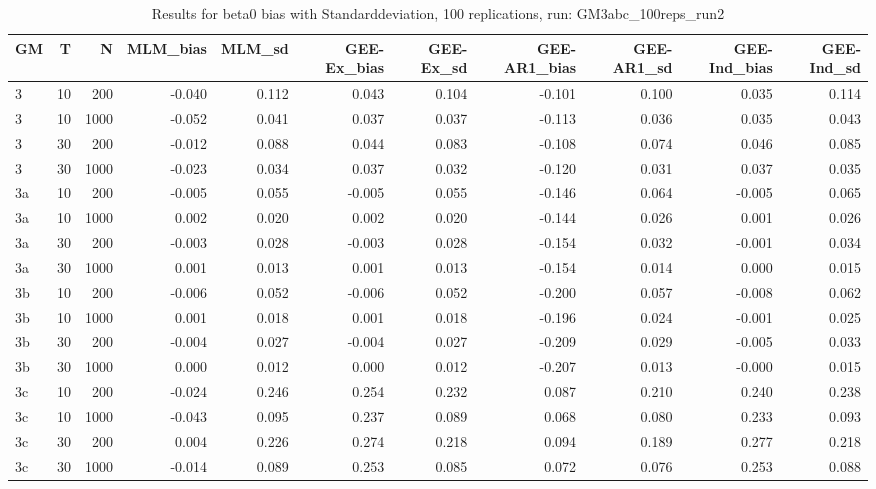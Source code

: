 \begin{table}[ht]
\centering
\begin{tabular}{lrrrrrrrrrr}
  \hline
GM & T & N & MLM\_bias & MLM\_sd & GEE-Ex\_bias & GEE-Ex\_sd & GEE-AR1\_bias & GEE-AR1\_sd & GEE-Ind\_bias & GEE-Ind\_sd \\ 
  \hline
3 & 10 & 200 & -0.040 & 0.112 & 0.043 & 0.104 & -0.101 & 0.100 & 0.035 & 0.114 \\ 
  3 & 10 & 1000 & -0.052 & 0.041 & 0.037 & 0.037 & -0.113 & 0.036 & 0.035 & 0.043 \\ 
  3 & 30 & 200 & -0.012 & 0.088 & 0.044 & 0.083 & -0.108 & 0.074 & 0.046 & 0.085 \\ 
  3 & 30 & 1000 & -0.023 & 0.034 & 0.037 & 0.032 & -0.120 & 0.031 & 0.037 & 0.035 \\ 
  3a & 10 & 200 & -0.005 & 0.055 & -0.005 & 0.055 & -0.146 & 0.064 & -0.005 & 0.065 \\ 
  3a & 10 & 1000 & 0.002 & 0.020 & 0.002 & 0.020 & -0.144 & 0.026 & 0.001 & 0.026 \\ 
   \hline
3a & 30 & 200 & -0.003 & 0.028 & -0.003 & 0.028 & -0.154 & 0.032 & -0.001 & 0.034 \\ 
  3a & 30 & 1000 & 0.001 & 0.013 & 0.001 & 0.013 & -0.154 & 0.014 & 0.000 & 0.015 \\ 
  3b & 10 & 200 & -0.006 & 0.052 & -0.006 & 0.052 & -0.200 & 0.057 & -0.008 & 0.062 \\ 
  3b & 10 & 1000 & 0.001 & 0.018 & 0.001 & 0.018 & -0.196 & 0.024 & -0.001 & 0.025 \\ 
  3b & 30 & 200 & -0.004 & 0.027 & -0.004 & 0.027 & -0.209 & 0.029 & -0.005 & 0.033 \\ 
  3b & 30 & 1000 & 0.000 & 0.012 & 0.000 & 0.012 & -0.207 & 0.013 & -0.000 & 0.015 \\ 
   \hline
3c & 10 & 200 & -0.024 & 0.246 & 0.254 & 0.232 & 0.087 & 0.210 & 0.240 & 0.238 \\ 
  3c & 10 & 1000 & -0.043 & 0.095 & 0.237 & 0.089 & 0.068 & 0.080 & 0.233 & 0.093 \\ 
  3c & 30 & 200 & 0.004 & 0.226 & 0.274 & 0.218 & 0.094 & 0.189 & 0.277 & 0.218 \\ 
  3c & 30 & 1000 & -0.014 & 0.089 & 0.253 & 0.085 & 0.072 & 0.076 & 0.253 & 0.088 \\ 
  \end{tabular}
\caption{Results for beta0 bias with Standarddeviation, 100 replications, run: GM3abc_100reps_run2} 
\label{tab:beta0_bias_sd}
\end{table}
